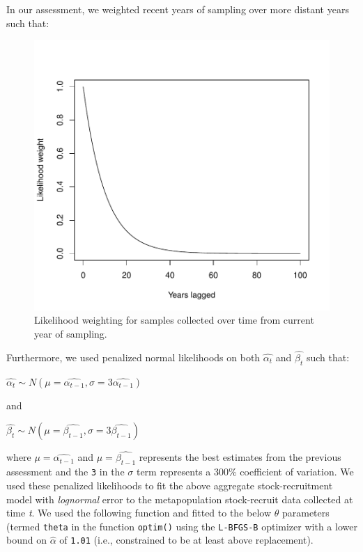 \documentclass[]{article}
\begin{document}
In our assessment, we weighted recent years of sampling over more
distant years such that:

\begin{figure}[H]

{\centering \includegraphics{Managing_for_ecological_surprises_in_metapopulations_makeHTML_files/figure-latex/unnamed-chunk-1-1} 

}

\caption{Likelihood weighting for samples collected over time from current year of sampling.}\label{fig:unnamed-chunk-1}
\end{figure}

Furthermore, we used penalized normal likelihoods on both
\(\hat{\alpha_t}\) and \(\hat{\beta_t}\) such that:

\(\hat{\alpha_t} \sim N(\mu=\hat{\alpha_{t-1}},\sigma=3\hat{\alpha_{t-1}})\)

and

\(\hat{\beta_t} \sim N(\mu=\hat{\beta_{t-1}},\sigma=3\hat{\beta_{t-1}})\)

where \(\mu=\hat{\alpha_{t-1}}\) and \(\mu=\hat{\beta_{t-1}}\)
represents the best estimates from the previous assessment and the
\texttt{3} in the \(\sigma\) term represents a 300\% coefficient of
variation. We used these penalized likelihoods to fit the above
aggregate stock-recruitment model with \emph{lognormal} error to the
metapopulation stock-recruit data collected at time \emph{t}. We used
the following function and fitted to the below \(\theta\) parameters
(termed \texttt{theta} in the function \texttt{optim()} using the
\texttt{L-BFGS-B} optimizer with a lower bound on \(\hat{\alpha}\) of
\texttt{1.01} (i.e., constrained to be at least above replacement).
\end{document}
